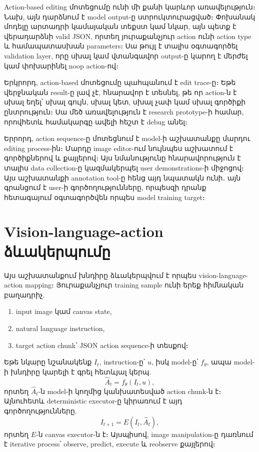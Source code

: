 \documentclass[12pt,a4paper]{report}
\newcommand{\Eng}[1]{\textenglish{#1}}
\begin{document}
Action-based editing մոտեցումը ունի մի քանի կարևոր առավելություն։ Նախ, այն դարձնում է model output-ը ստրուկտուրացված։ Փոխանակ մոդելը արտադրի կամայական տեքստ կամ նկար, այն պետք է վերադարձնի valid JSON, որտեղ յուրաքանչյուր action ունի action type և համապատասխան parameters։ Սա թույլ է տալիս օգտագործել validation layer, որը սխալ կամ վտանգավոր output-ը կարող է մերժել կամ փոխարինել noop action-ով։

Երկրորդ, action-based մոտեցումը պահպանում է edit trace-ը։ Եթե վերջնական result-ը լավ չէ, հնարավոր է տեսնել, թե որ action-ն է սխալ եղել՝ սխալ գույն, սխալ կետ, սխալ չափ կամ սխալ գործիքի ընտրություն։ Սա մեծ առավելություն է research prototype-ի համար, որովհետև համակարգը ավելի հեշտ է debug անել։

Երրորդ, action sequence-ը մոտեցնում է model-ի աշխատանքը մարդու editing process-ին։ Մարդը image editor-ում նույնպես աշխատում է գործիքներով և քայլերով։ Այս նմանությունը հնարավորություն է տալիս data collection-ը կազմակերպել user demonstrations-ի միջոցով։ Այս աշխատանքի annotation tool-ը հենց այդ նպատակն ունի․ այն գրանցում է user-ի գործողությունները, որպեսզի դրանք հետագայում օգտագործվեն որպես model training target։

\section{Vision-language-action ձևակերպումը}

Այս աշխատանքում խնդիրը ձևակերպվում է որպես \Eng{vision-language-action} mapping։ Յուրաքանչյուր training sample ունի երեք հիմնական բաղադրիչ.
\begin{enumerate}
    \item input image կամ canvas state,
    \item natural language instruction,
    \item target action chunk՝ JSON action sequence-ի տեսքով։
\end{enumerate}

Եթե նկարը նշանակենք $I_t$, instruction-ը՝ $u$, իսկ model-ը՝ $f_\theta$, ապա model-ի խնդիրը կարելի է գրել հետևյալ կերպ.
\begin{equation}
    \hat{A}_t = f_\theta(I_t, u),
\end{equation}
որտեղ $\hat{A}_t$-ն model-ի կողմից կանխատեսված action chunk-ն է։ Այնուհետև deterministic executor-ը կիրառում է այդ գործողությունները.
\begin{equation}
    I_{t+1} = E(I_t, \hat{A}_t),
\end{equation}
որտեղ $E$-ն canvas executor-ն է։ Այսպիսով, image manipulation-ը դառնում է iterative process՝ observe, predict, execute և reobserve քայլերով։
\end{document}
